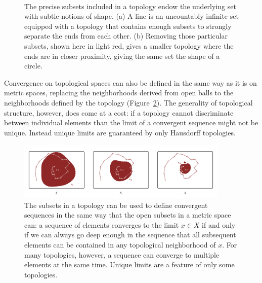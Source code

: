 \documentclass[
  letterpaper,
  DIV=11,
  numbers=noendperiod]{scrartcl}
\begin{document}
\begin{figure}
\begin{minipage}[t]{0.45\linewidth}
\subcaption{\label{fig-circle-topology}}
\end{minipage}%
%
\begin{minipage}[t]{0.05\linewidth}

{\centering 

~

}

\end{minipage}%

\caption{\label{fig-line-verses-circle}The precise subsets included in a
topology endow the underlying set with subtle notions of shape. (a) A
line is an uncountably infinite set equipped with a topology that
contains enough subsets to strongly separate the ends from each other.
(b) Removing those particular subsets, shown here in light red, gives a
smaller topology where the ends are in closer proximity, giving the same
set the shape of a circle.}

\end{figure}

Convergence on topological spaces can also be defined in the same way as
it is on metric spaces, replacing the neighborhoods derived from open
balls to the neighborhoods defined by the topology
(Figure~\ref{fig-general-convergence}). The generality of topological
structure, however, does come at a cost: if a topology cannot
discriminate between individual elements than the limit of a convergent
sequence might not be unique. Instead unique limits are guaranteed by
only Hausdorff topologies.

\begin{figure}

{\centering \includegraphics[width=0.9\textwidth,height=\textheight]{figures/structures/general_topology/convergence/convergence.pdf}

}

\caption{\label{fig-general-convergence}The subsets in a topology can be
used to define convergent sequences in the same way that the open
subsets in a metric space can: a sequence of elements converges to the
limit \(x \in X\) if and only if we can always go deep enough in the
sequence that all subsequent elements can be contained in any
topological neighborhood of \(x\). For many topologies, however, a
sequence can converge to multiple elements at the same time. Unique
limits are a feature of only some topologies.}

\end{figure}
\end{document}
